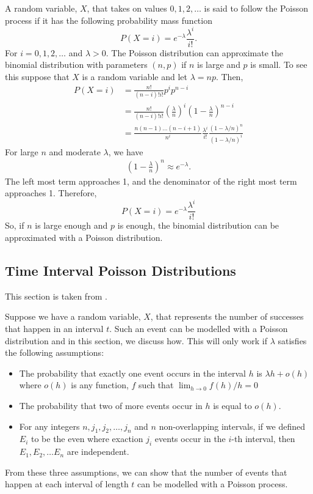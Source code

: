\documentclass{article}
\begin{document}
A random variable, $X$, that takes on values $0, 1, 2, \dots$ is said to follow the Poisson process if it has the following probability mass function
\begin{equation}
    P(X = i) = e ^ {-\lambda} \frac{\lambda ^ i}{i!}.
\end{equation}
For $i = 0, 1, 2, \dots$ and $\lambda > 0$. The Poisson distribution can approximate the binomial distribution with parameters $(n, p)$ if $n$ is large and $p$ is small. To see this suppose that $X$ is a random variable and let $\lambda = np$. Then,
\begin{align*}
    P(X = i) & = \frac{n!}{(n - i)!i!} p^i p^{n - i} \\
             & = \frac{n!}{(n - i)!i!} \left( \frac{\lambda}{n} \right)^i \left( 1 - \frac{\lambda}{n} \right)^{n - i} \\
             & = \frac{n(n-1)\dots(n-i+1)}{n^i} \frac{\lambda^i}{i!} \frac{(1 - \lambda / n)^n}{(1 - \lambda / n)^i}
\end{align*}
For large $n$ and moderate $\lambda$, we have
\begin{align*}
    \left(1 - \frac{\lambda}{n}\right)^n \approx e^{-\lambda}.
\end{align*}
The left most term approaches 1, and the denominator of the right most term approaches 1. Therefore,
\begin{equation*}
    P(X = i) = e^{-\lambda} \frac{\lambda^i}{i!}
\end{equation*}
So, if $n$ is large enough and $p$ is enough, the binomial distribution can be approximated with a Poisson distribution.

\subsection{Time Interval Poisson Distributions}

This section is taken from \cite{ross98}.

Suppose we have a random variable, $X$, that represents the number of successes that happen in an interval $t$. Such an event can be modelled with a Poisson distribution and in this section, we discuss how. This will only work if $\lambda$ satisfies the following assumptions:

\begin{itemize}
\item The probability that exactly one event occurs in the interval $h$ is $\lambda h + o(h)$ where $o(h)$ is any function, $f$ such that $\lim_{h \xrightarrow{} 0} f(h) / h = 0$
\item The probability that two of more events occur in $h$ is equal to $o(h)$.
\item For any integers $n, j_1, j_2, \dots, j_n$ and $n$ non-overlapping intervals, if we defined $E_i$ to be the even where exaction $j_i$ events occur in the $i$-th interval, then $E_1, E_2, \dots E_n$ are independent.
\end{itemize}
From these three assumptions, we can show that the number of events that happen at each interval of length $t$ can be modelled with a Poisson process.
\end{document}

